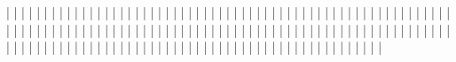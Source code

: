 |                   |
|                   |
|                   |
|                   |
|                   |
|                   |
|                   |
|                   |
|                   |
|                   |
|                   |
|                   |
|                   |
|                   |
|                   |
|                   |
|                   |
|                   |
|                   |
|                   |
|                   |
|                   |
|                   |
|                   |
|                   |
|                   |
|                   |
|                   |
|                   |
|                   |
|                   |
|                   |
|                   |
|                   |
|                   |
|                   |
|                   |
|                   |
|                   |
|                   |
|                   |
|                   |
|                   |
|                   |
|                   |
|                   |
|                   |
|                   |
|                   |
|                   |
|                   |
|                   |
|                   |
|                   |
|                   |
|                   |
|                   |
|                   |
|                   |
|                   |
|                   |
|                   |
|                   |
|                   |
|                   |
|                   |
|                   |
|                   |
|                   |
|                   |
|                   |
|                   |
|                   |
|                   |
|                   |
|                   |
|                   |
|                   |
|                   |
|                   |
|                   |
|                   |
|                   |
|                   |